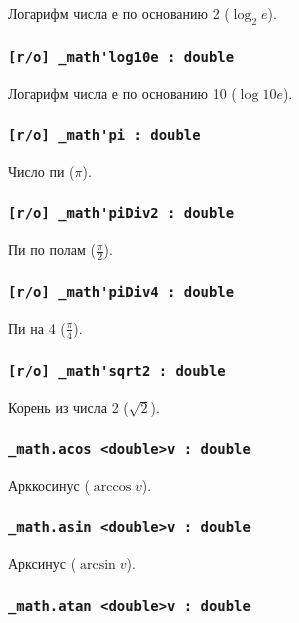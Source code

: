 \documentclass[a4paper, 14pt]{extarticle}
\begin{document}
Логарифм числа е по основанию 2 ($\log_{2}{e}$).

\subsubsection{\lstinline|[r/o] _math'log10e : double|}

Логарифм числа е по основанию 10 ($\log{10}{e}$).

\subsubsection{\lstinline|[r/o] _math'pi : double|}

Число пи ($\pi$).

\subsubsection{\lstinline|[r/o] _math'piDiv2 : double|}

Пи по полам ($\frac{\pi}{2}$).

\subsubsection{\lstinline|[r/o] _math'piDiv4 : double|}

Пи на 4 ($\frac{\pi}{4}$).

\subsubsection{\lstinline|[r/o] _math'sqrt2 : double|}

Корень из числа 2 ($\sqrt{2}$).

\subsubsection{\lstinline|_math.acos <double>v : double|}

Арккосинус ($\arccos{v}$).

\subsubsection{\lstinline|_math.asin <double>v : double|}

Арксинус ($\arcsin{v}$).

\subsubsection{\lstinline|_math.atan <double>v : double|}
\end{document}
